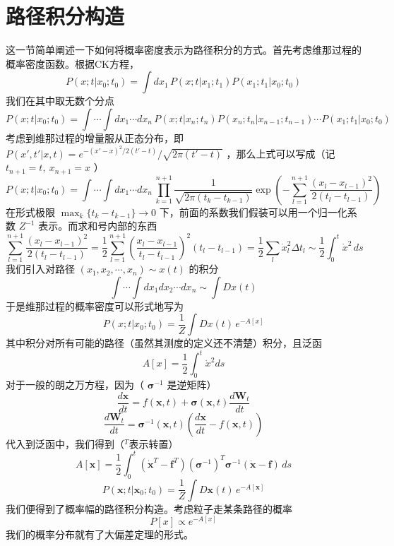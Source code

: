 \documentclass{ctexart}
\begin{document}
\section{路径积分构造}
这一节简单阐述一下如何将概率密度表示为路径积分的方式。首先考虑维那过程的概率密度函数。根据CK方程，
\begin{equation}
P(x;t|x_0;t_0)=\int dx_1\,P(x;t|x_1;t_1)P(x_1;t_1|x_0;t_0)
\end{equation}
我们在其中取无数个分点
\begin{equation}
P(x;t|x_0;t_0)=\int\cdots\int dx_1\cdots dx_n\,P(x;t|x_n;t_n)P(x_n;t_n|x_{n-1};t_{n-1})\cdots P(x_1;t_1|x_0;t_0)
\end{equation}
考虑到维那过程的增量服从正态分布，即 $P(x',t'|x,t)=e^{-(x'-x)^2/2(t'-t)}/\sqrt{2\pi(t'-t)}$ ，那么上式可以写成（记 $t_{n+1}=t,\ x_{n+1}=x$ ）
\begin{equation}
P(x;t|x_0;t_0)=\int\cdots\int dx_1\cdots dx_n\,\prod_{k=1}^{n+1} \frac{1}{\sqrt{2\pi(t_k-t_{k-1})}}\exp\left(-\sum_{l=1}^{n+1}\frac{(x_l-x_{l-1})^2}{2(t_l-t_{l-1})}\right)
\end{equation}
在形式极限 $\max_k\{t_{k}-t_{k-1}\}\to0$ 下，前面的系数我们假装可以用一个归一化系数 $Z^{-1}$ 表示。而求和号内部的东西
\begin{equation}
\sum_{l=1}^{n+1}\frac{(x_l-x_{l-1})^2}{2(t_l-t_{l-1})}=\frac{1}{2}\sum_{l=1}^{n+1}\left(\frac{x_l-x_{l-1}}{t_l-t_{l-1}}\right)^2(t_l-t_{l-1})=\frac{1}{2}\sum_l\dot{x}_l^2 \Delta t_l\sim\frac{1}{2}\int_0^t\dot{x}^2\, ds
\end{equation}
我们引入对路径 $(x_1,x_2,\cdots,x_n)\sim x(t)$ 的积分
\begin{equation}
\int\cdots\int dx_1dx_2\cdots dx_n\sim \int Dx(t)
\end{equation}
于是维那过程的概率密度可以形式地写为
\begin{equation}
P(x;t|x_0;t_0)=\frac{1}{Z}\int Dx(t)\, e^{-A[x]}
\end{equation}
其中积分对所有可能的路径（虽然其测度的定义还不清楚）积分，且泛函
\begin{equation}
A[x]=\frac{1}{2}\int_0^t \dot{x}^2 ds
\end{equation}
对于一般的朗之万方程，因为（ $\bm{\sigma}^{-1}$ 是逆矩阵）
\begin{equation}
\frac{d\bm{x}}{dt}=f(\bm{x},t)+\bm{\sigma}(\bm{x},t)\frac{d\bm{W}_t}{dt}
\end{equation}
\begin{equation}
\frac{d\bm{W}_t}{dt}=\bm{\sigma}^{-1}(\bm{x},t)\left(\frac{d\bm{x}}{dt}-f(\bm{x},t)\right)
\end{equation}
代入到泛函中，我们得到（$^T$表示转置）
\begin{equation}
A[\bm{x}]=\frac{1}{2}\int_0^t \left(\dot{\bm{x}}^T-\bm{f}^T\right)(\bm{\sigma}^{-1})^T\bm{\sigma}^{-1}\left(\dot{\bm{x}}-\bm{f}\right)\,ds
\end{equation}
\begin{equation}
P(\bm{x};t|\bm{x}_0;t_0)=\frac{1}{Z}\int D\bm{x}(t)\, e^{-A[\bm{x}]}
\end{equation}
我们便得到了概率幅的路径积分构造。考虑粒子走某条路径的概率
\begin{equation}
P[x]\propto e^{-A[x]}
\end{equation}
我们的概率分布就有了大偏差定理的形式。
\end{document}

